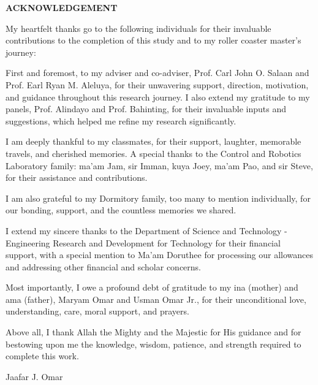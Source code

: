 
\begin{center}
	\noindent \textbf{ACKNOWLEDGEMENT}
\end{center}

My heartfelt thanks go to the following individuals for their invaluable contributions to the completion of this study and to my roller coaster master's journey:

First and foremost, to my adviser and co-adviser, Prof. Carl John O. Salaan and Prof. Earl Ryan M. Aleluya, for their unwavering support, direction, motivation, and guidance throughout this research journey. I also extend my gratitude to my panels, Prof. Alindayo and Prof. Bahinting, for their invaluable inputs and suggestions, which helped me refine my research significantly.

I am deeply thankful to my classmates, for their support, laughter, memorable travels, and cherished memories. A special thanks to the Control and Robotics Laboratory family: ma'am Jam, sir Imman, kuya Joey, ma'am Pao, and sir Steve, for their assistance and contributions.

I am also grateful to my Dormitory family, too many to mention individually, for our bonding, support, and the countless memories we shared.

I extend my sincere thanks to the Department of Science and Technology - Engineering Research and Development for Technology for their financial support, with a special mention to Ma'am Doruthee for processing our allowances and addressing other financial and scholar concerns.

Most importantly, I owe a profound debt of gratitude to my ina (mother) and ama (father), Maryam Omar and Usman Omar Jr., for their unconditional love, understanding, care, moral support, and prayers.

Above all, I thank Allah the Mighty and the Majestic for His guidance and for bestowing upon me the knowledge, wisdom, patience, and strength required to complete this work.

\vspace{0.5cm}

\begin{flushright}
	Jaafar J. Omar
\end{flushright}

\vspace{0.5cm}